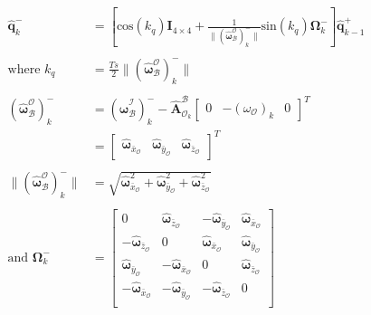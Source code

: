 \begin{equation}
	\begin{aligned}
		\hat{\mathbf{q}}_k^- &= \left[\text{cos}(k_q)\mathbf{I}_{4 \times 4} + \frac{1}{\lVert (\boldsymbol{\hat{\omega}}_{\mathcal{B}}^{\mathcal{O}})_k^- \rVert} \text{sin}(k_q) \mathbf{\Omega}_k^- \right] \hat{\mathbf{q}}_{k-1}^+ \\ \\
		\text{where } k_q &= \frac{Ts}{2} \lVert (\boldsymbol{\hat{\omega}}_{\mathcal{B}}^{\mathcal{O}})_k^- \rVert \\ \\
		(\boldsymbol{\hat{\omega}}_{\mathcal{B}}^{\mathcal{O}})_k^- &= (\boldsymbol{\hat{\omega}}_{\mathcal{B}}^{\mathcal{I}})_k^- - \boldsymbol{\hat{A}}^{\mathcal{B}}_{\mathcal{O}_k} \begin{bmatrix} 0 & -(\omega_\mathcal{O})_k & 0\end{bmatrix}^T \\
		&= \begin{bmatrix} \boldsymbol{\hat{\omega}}_{\bar{x}_{\mathcal{O}}} & \boldsymbol{\hat{\omega}}_{\bar{y}_{\mathcal{O}}}  & \boldsymbol{\hat{\omega}}_{\bar{z}_{\mathcal{O}}} \end{bmatrix}^T \\ \\
		\lVert (\boldsymbol{\hat{\omega}}_{\mathcal{B}}^{\mathcal{O}})_k^- \rVert &= \sqrt{\boldsymbol{\hat{\omega}}_{\bar{x}_{\mathcal{O}}}^2 + \boldsymbol{\hat{\omega}}_{\bar{y}_{\mathcal{O}}}^2 + \boldsymbol{\hat{\omega}}_{\bar{z}_{\mathcal{O}}}^2} \\ \\
		\text{and } \mathbf{\Omega}_k^- &= \begin{bmatrix} 
			0 & \boldsymbol{\hat{\omega}}_{\bar{z}_{\mathcal{O}}} & -\boldsymbol{\hat{\omega}}_{\bar{y}_{\mathcal{O}}} & \boldsymbol{\hat{\omega}}_{\bar{x}_{\mathcal{O}}} \\
			-\boldsymbol{\hat{\omega}}_{\bar{z}_{\mathcal{O}}} & 0 & \boldsymbol{\hat{\omega}}_{\bar{x}_{\mathcal{O}}} & \boldsymbol{\hat{\omega}}_{\bar{y}_{\mathcal{O}}}			\\
			\boldsymbol{\hat{\omega}}_{\bar{y}_{\mathcal{O}}} & -\boldsymbol{\hat{\omega}}_{\bar{x}_{\mathcal{O}}} & 0 & \boldsymbol{\hat{\omega}}_{\bar{z}_{\mathcal{O}}}			\\
			-\boldsymbol{\hat{\omega}}_{\bar{x}_{\mathcal{O}}} & -\boldsymbol{\hat{\omega}}_{\bar{y}_{\mathcal{O}}} & -\boldsymbol{\hat{\omega}}_{\bar{z}_{\mathcal{O}}} & 0			\\
		\end{bmatrix}
	\end{aligned}
	\label{eq:q-propagation}
\end{equation}

